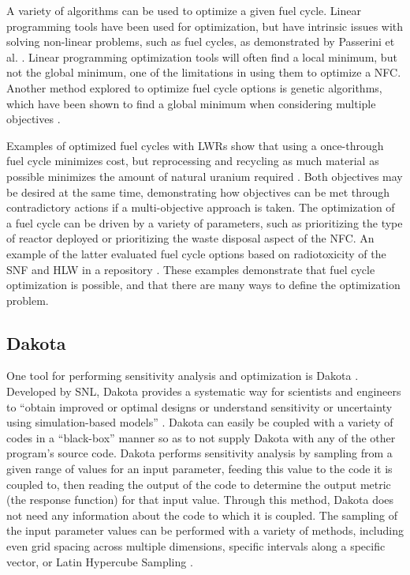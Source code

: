 A variety of algorithms can be used to optimize a given 
fuel cycle. Linear programming tools have been used for 
optimization, but have intrinsic issues with solving non-linear 
problems, such as fuel cycles, as demonstrated by 
Passerini et al. \cite{passerini_systematic_2014}.
Linear programming optimization tools will often find a local minimum, 
but not the global minimum, one of the limitations in using them 
to optimize a \gls{NFC}. Another method explored to optimize fuel cycle 
options is genetic algorithms, which have been shown to find a global 
minimum when considering multiple objectives \cite{passerini_systematic_2014}. 

Examples of optimized fuel cycles with \glspl{LWR} show that using a
once-through fuel cycle minimizes cost, but reprocessing and recycling as 
much material as possible minimizes the amount of natural uranium 
required \cite{kunsch_nuclear_1987}. Both objectives may 
be desired at the same time, demonstrating how 
objectives can be met through contradictory actions if a multi-objective 
approach is taken. The optimization of a fuel cycle can be driven 
by a variety of parameters, such as prioritizing the type of reactor 
deployed or prioritizing the waste disposal 
aspect of the \gls{NFC}. An example of the latter 
evaluated fuel cycle options based on radiotoxicity of the \gls{SNF} and 
\gls{HLW} in a repository \cite{del_cul_advanced_2010}. These examples 
demonstrate that fuel cycle optimization is possible, and that there 
are many ways to define the optimization problem. 

\subsection{Dakota}
One tool for performing sensitivity analysis and optimization is 
Dakota \cite{adams_dakota_2021}. Developed by \gls{SNL}, Dakota provides 
a systematic way for scientists and 
engineers to ``obtain improved or optimal designs or understand sensitivity
or uncertainty using simulation-based models'' \cite{adams_dakota_2021}.
Dakota can easily be coupled with a variety of codes in a ``black-box'' 
manner so as to not supply Dakota with any of the other program's source code.
Dakota performs sensitivity analysis by sampling from a given range of 
values for an input parameter, feeding this value to the code it is 
coupled to, then reading the output of the code to determine the output 
metric (the response function) for that input value. Through this method, 
Dakota does not need any information about the code to which it is coupled. 
The sampling of the input parameter values can be performed with a variety of 
methods, including even grid spacing across multiple dimensions, specific 
intervals along a specific vector, or Latin Hypercube Sampling 
\cite{adams_dakota_2021}.


